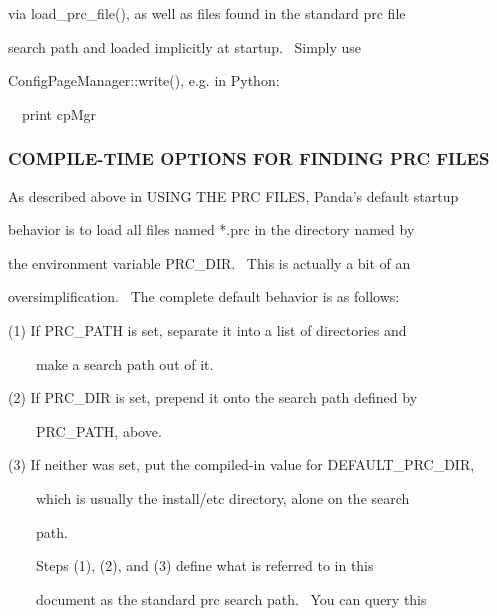 \documentclass[a4paper]{article}
\begin{document}
{\color{black}
via load\_prc\_file(), as well as files found in the standard prc file}

{\color{black}
search path and loaded implicitly at startup. \ Simply use}

{\color{black}
ConfigPageManager::write(), e.g. in Python:}


\bigskip

{\color{black}
\ \ print cpMgr}


\bigskip


\bigskip

\subsubsection[COMPILE{}-TIME OPTIONS FOR FINDING PRC FILES]{COMPILE-TIME OPTIONS FOR FINDING PRC FILES}
\hypertarget{RefHeading312421927442421}{}
\bigskip

{\color{black}
As described above in USING THE PRC FILES, Panda's default startup}

{\color{black}
behavior is to load all files named *.prc in the directory named by}

{\color{black}
the environment variable PRC\_DIR. \ This is actually a bit of an}

{\color{black}
oversimplification. \ The complete default behavior is as follows:}


\bigskip

{\color{black}
(1) If PRC\_PATH is set, separate it into a list of directories and}

{\color{black}
\ \ \ \ make a search path out of it.}


\bigskip

{\color{black}
(2) If PRC\_DIR is set, prepend it onto the search path defined by}

{\color{black}
\ \ \ \ PRC\_PATH, above.}


\bigskip

{\color{black}
(3) If neither was set, put the compiled-in value for DEFAULT\_PRC\_DIR,}

{\color{black}
\ \ \ \ which is usually the install/etc directory, alone on the search}

{\color{black}
\ \ \ \ path.}


\bigskip

{\color{black}
\ \ \ \ Steps (1), (2), and (3) define what is referred to in this}

{\color{black}
\ \ \ \ document as {\textquotedbl}the standard prc search path{\textquotedbl}. \ You can query this}
\end{document}
